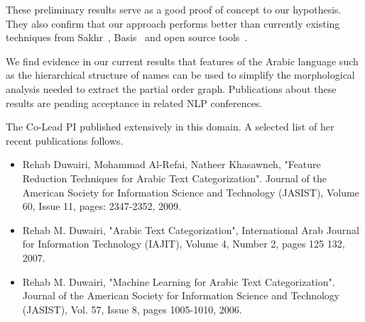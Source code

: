 \documentclass[12pt]{article}
\begin{document}
These preliminary results serve as a good proof of concept to our 
hypothesis. They also confirm that our approach performs better than 
currently existing techniques from Sakhr~\cite{Sak09},
Basis~\cite{Bas09} and open source 
tools~\cite{Col09,Otakar:07,Tim04}.

We find evidence in our current results that features 
of the Arabic language such as the hierarchical structure of
names can be used to simplify the morphological analysis
needed to extract the partial order graph. 
Publications about these results are pending acceptance in 
related NLP conferences. 

The Co-Lead PI published extensively in this domain. 
A selected list of her recent publications follows. 
\begin{itemize}\itemsep0pt
\item Rehab Duwairi, Mohammad Al-Refai, Natheer Khasawneh, 
"Feature Reduction Techniques for Arabic Text Categorization". 
Journal of the American Society for Information Science and Technology 
(JASIST), Volume 60, Issue 11, pages: 2347-2352, 2009. 
\item Rehab M. Duwairi, "Arabic Text Categorization", 
International Arab Journal for Information Technology (IAJIT), 
Volume 4, Number 2, pages 125  132, 2007.
\item Rehab M. Duwairi, "Machine Learning for Arabic Text Categorization". 
Journal of the American Society for Information Science and Technology 
(JASIST), Vol. 57, Issue 8, pages 1005-1010, 2006.
\end{itemize}


\end{document}
